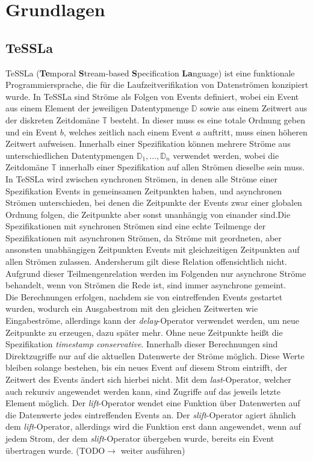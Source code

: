 
\chapter{Grundlagen}
\label{chapter-basics}

\section{TeSSLa}

TeSSLa (\textbf{Te}mporal \textbf{S}tream-based \textbf{S}pecification \textbf{La}nguage) ist eine funktionale Programmiersprache, die für die Laufzeitverifikation von Datenströmen konzipiert wurde. In TeSSLa sind Ströme als Folgen von Events definiert, wobei ein Event aus einem Element der jeweiligen Datentypmenge $\mathbb D$ sowie aus einem Zeitwert aus der diskreten Zeitdomäne $\mathbb T$ besteht. In dieser muss es eine totale Ordnung geben und ein Event $b$, welches zeitlich nach einem Event $a$ auftritt, muss einen höheren Zeitwert aufweisen. Innerhalb einer Spezifikation können mehrere Ströme aus unterschiedlichen Datentypmengen $\mathbb D_1, \dots, \mathbb D_n$ verwendet werden, wobei die Zeitdomäne $\mathbb T$ innerhalb einer Spezifikation auf allen Strömen dieselbe sein muss.\\
In TeSSLa wird zwischen synchronen Strömen, in denen alle Ströme einer Spezifikation Events in gemeinsamen Zeitpunkten haben, und asynchronen Strömen unterschieden, bei denen die Zeitpunkte der Events zwar einer globalen Ordnung folgen, die Zeitpunkte aber sonst unanhängig von einander sind.Die Spezifikationen mit synchronen Strömen sind eine echte Teilmenge der Spezifikationen mit asynchronen Strömen, da Ströme mit geordneten, aber ansonsten unabhängigen Zeitpunkten Events mit gleichzeitigen Zeitpunkten auf allen Strömen zulassen. Andersherum gilt diese Relation offensichtlich nicht. Aufgrund dieser Teilmengenrelation werden im Folgenden nur asynchrone Ströme behandelt, wenn von Strömen die Rede ist, sind immer asynchrone gemeint.\\
Die Berechnungen erfolgen, nachdem sie von eintreffenden Events gestartet wurden, wodurch ein Ausgabestrom mit den gleichen Zeitwerten wie Eingabeströme, allerdings kann der \emph{delay}-Operator verwendet werden, um neue Zeitpunkte zu erzeugen, dazu später mehr. Ohne neue Zeitpunkte heißt die Spezifikation \emph{timestamp conservative}. Innerhalb dieser Berechnungen sind Direktzugriffe nur auf die aktuellen Datenwerte der Ströme möglich. Diese Werte bleiben solange bestehen, bis ein neues Event auf diesem Strom eintrifft, der Zeitwert des Events ändert sich hierbei nicht. Mit dem \emph{last}-Operator, welcher auch rekursiv angewendet werden kann, sind Zugriffe auf das jeweils letzte Element möglich. Der \emph{lift}-Operator wendet eine Funktion über Datenwerten auf die Datenwerte jedes eintreffenden Events an. Der \emph{slift}-Operator agiert ähnlich dem \emph{lift}-Operator, allerdings wird die Funktion erst dann angewendet, wenn auf jedem Strom, der dem \emph{slift}-Operator übergeben wurde, bereits ein Event übertragen wurde. (TODO$\rightarrow$ weiter ausführen)\\
